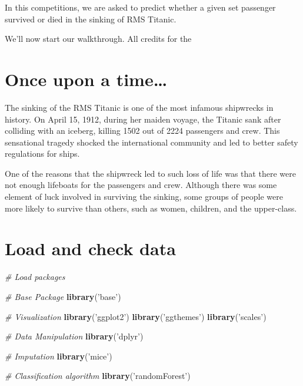 \documentclass[]{book}
\newenvironment{Shaded}{\begin{snugshade}}{\end{snugshade}}
\newcommand{\KeywordTok}[1]{\textcolor[rgb]{0.13,0.29,0.53}{\textbf{#1}}}
\newcommand{\StringTok}[1]{\textcolor[rgb]{0.31,0.60,0.02}{#1}}
\newcommand{\CommentTok}[1]{\textcolor[rgb]{0.56,0.35,0.01}{\textit{#1}}}
\newcommand{\NormalTok}[1]{#1}
\theoremstyle{definition}
\theoremstyle{definition}
\theoremstyle{definition}
\theoremstyle{remark}
\begin{document}
In this competitions, we are asked to predict whether a given set
passenger survived or died in the sinking of RMS Titanic.

We'll now start our walkthrough. All credits for the

\section{Once upon a time\ldots{}}\label{once-upon-a-time}

The sinking of the RMS Titanic is one of the most infamous shipwrecks in
history. On April 15, 1912, during her maiden voyage, the Titanic sank
after colliding with an iceberg, killing 1502 out of 2224 passengers and
crew. This sensational tragedy shocked the international community and
led to better safety regulations for ships.

One of the reasons that the shipwreck led to such loss of life was that
there were not enough lifeboats for the passengers and crew. Although
there was some element of luck involved in surviving the sinking, some
groups of people were more likely to survive than others, such as women,
children, and the upper-class.

\section{Load and check data}\label{load-and-check-data}

\begin{Shaded}
\begin{Highlighting}[]
\CommentTok{# Load packages}

\CommentTok{# Base Package}
\KeywordTok{library}\NormalTok{(}\StringTok{'base'}\NormalTok{)}

\CommentTok{# Visualization}
\KeywordTok{library}\NormalTok{(}\StringTok{'ggplot2'}\NormalTok{)}
\KeywordTok{library}\NormalTok{(}\StringTok{'ggthemes'}\NormalTok{)}
\KeywordTok{library}\NormalTok{(}\StringTok{'scales'}\NormalTok{)}

\CommentTok{# Data Manipulation}
\KeywordTok{library}\NormalTok{(}\StringTok{'dplyr'}\NormalTok{) }

\CommentTok{# Imputation}
\KeywordTok{library}\NormalTok{(}\StringTok{'mice'}\NormalTok{) }

\CommentTok{# Classification algorithm}
\KeywordTok{library}\NormalTok{(}\StringTok{'randomForest'}\NormalTok{) }
\end{Highlighting}
\end{Shaded}
\end{document}

